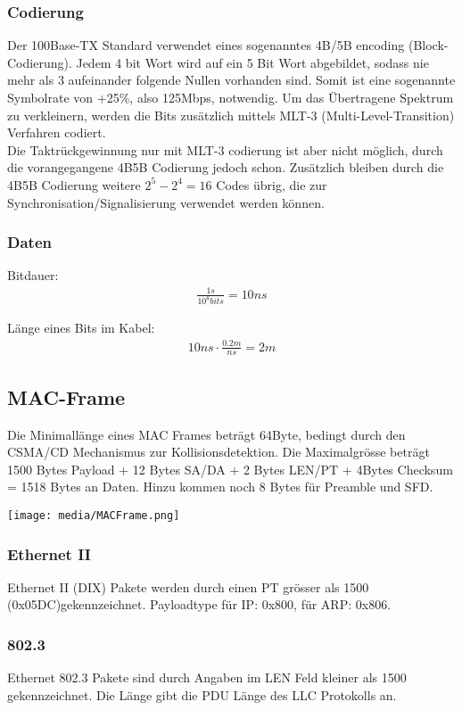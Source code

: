 \subsubsection{Codierung}
Der 100Base-TX Standard verwendet eines sogenanntes 4B/5B encoding (Block-Codierung). Jedem 4 bit Wort wird auf ein 5 Bit Wort abgebildet, sodass nie mehr als 3 aufeinander folgende Nullen vorhanden sind. Somit ist eine sogenannte Symbolrate von +25\%, also 125Mbps, notwendig.
Um das Übertragene Spektrum zu verkleinern, werden die Bits zusätzlich mittels MLT-3 (Multi-Level-Transition) Verfahren codiert.\\
Die Taktrückgewinnung nur mit MLT-3 codierung ist aber nicht möglich, durch die vorangegangene 4B5B Codierung jedoch schon. Zusätzlich bleiben durch die 4B5B Codierung weitere $2^5-2^4=16$ Codes übrig, die zur Synchronisation/Signalisierung verwendet werden können.


\subsubsection{Daten}
Bitdauer:
\begin{align*}
\frac{1s}{10^{8}bits} = 10ns
\end{align*}

Länge eines Bits im Kabel:
\begin{align}
10ns \cdot \frac{0.2m}{ns} = 2m
\end{align}

\subsection{MAC-Frame}
Die Minimallänge eines MAC Frames beträgt 64Byte, bedingt durch den CSMA/CD Mechanismus zur Kollisionsdetektion.
Die Maximalgrösse beträgt 1500 Bytes Payload + 12 Bytes SA/DA + 2 Bytes LEN/PT + 4Bytes Checksum = 1518 Bytes an Daten. Hinzu kommen noch 8 Bytes für Preamble und SFD.

\texttt{[image: media/MACFrame.png]}

\subsubsection{Ethernet II}
Ethernet II (DIX) Pakete werden durch einen PT grösser als 1500 (0x05DC)gekennzeichnet. Payloadtype für IP: 0x800, für ARP: 0x806.

\subsubsection{802.3}
Ethernet 802.3 Pakete sind durch Angaben im LEN Feld kleiner als 1500 gekennzeichnet. Die Länge gibt die PDU Länge des LLC Protokolls an.

